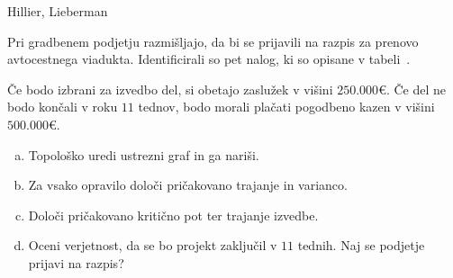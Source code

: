 \begin{naloga}{Hillier, Lieberman}{\cite[Problem~10.4-4]{hl}}
\begin{vprasanje}[viadukt]
Pri gradbenem podjetju razmišljajo,
da bi se prijavili na razpis za prenovo avtocestnega viadukta.
Identificirali so pet nalog, ki so opisane v tabeli~\tab{}.

Če bodo izbrani za izvedbo del, si obetajo zaslužek v višini $250.000 €$.
Če del ne bodo končali v roku $11$ tednov,
bodo morali plačati pogodbeno kazen v višini $500.000 €$.
\begin{enumerate}[(a)]
\item Topološko uredi ustrezni graf in ga nariši.
\item Za vsako opravilo določi pričakovano trajanje in varianco.
\item Določi pričakovano kritično pot ter trajanje izvedbe.
\item Oceni verjetnost, da se bo projekt zaključil v $11$ tednih.
Naj se podjetje prijavi na razpis?
\end{enumerate}

\begin{tabela}
\end{tabela}
\end{vprasanje}
\begin{odgovor}
\end{odgovor}
\end{naloga}



